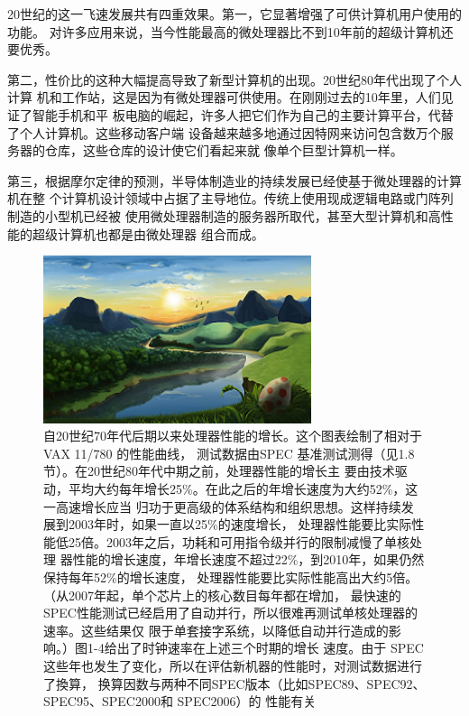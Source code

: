 20世纪的这一飞速发展共有四重效果。第一，它显著增强了可供计算机用户使用的功能。
对许多应用来说，当今性能最高的微处理器比不到10年前的超级计算机还要优秀。

第二，性价比的这种大幅提高导致了新型计算机的出现。20世纪80年代出现了个人计算
机和工作站，这是因为有微处理器可供使用。在刚刚过去的10年里，人们见证了智能手机和平
板电脑的崛起，许多人把它们作为自己的主要计算平台，代替了个人计算机。这些移动客户端
设备越来越多地通过因特网来访问包含数万个服务器的仓库，这些仓库的设计使它们看起来就
像单个巨型计算机一样。

第三，根据摩尔定律的预测，半导体制造业的持续发展已经使基于微处理器的计算机在整
个计算机设计领域中占据了主导地位。传统上使用现成逻辑电路或门阵列制造的小型机已经被
使用微处理器制造的服务器所取代，甚至大型计算机和高性能的超级计算机也都是由微处理器
组合而成。

\begin{figure}[!htb]
    \centering
	\includegraphics[width=0.7\textwidth]{imgs/sam.png}
	\caption{自20世纪70年代后期以来处理器性能的增长。这个图表绘制了相对于 VAX 11/780 的性能曲线，
            测试数据由SPEC 基准测试测得（见1.8节）。在20世纪80年代中期之前，处理器性能的增长主
            要由技术驱动，平均大约每年增长25\%。在此之后的年增长速度为大约52\%，这一高速增长应当
            归功于更高级的体系结构和组织思想。这样持续发展到2003年时，如果一直以25\%的速度增长，
            处理器性能要比实际性能低25倍。2003年之后，功耗和可用指令级并行的限制减慢了单核处理
            器性能的增长速度，年增长速度不超过22\%，到2010年，如果仍然保持每年52\%的增长速度，
            处理器性能要比实际性能高出大约5倍。（从2007年起，单个芯片上的核心数目每年都在增加，
            最快速的SPEC性能测试已经启用了自动并行，所以很难再测试单核处理器的速率。这些结果仅
            限于单套接字系统，以降低自动并行造成的影响。）图1-4给出了时钟速率在上述三个时期的增长
            速度。由于 SPEC这些年也发生了变化，所以在评估新机器的性能时，对测试数据进行了換算，
            换算因数与两种不同SPEC版本（比如SPEC89、SPEC92、SPEC95、SPEC2000和 SPEC2006）的
            性能有关}
\end{figure}

